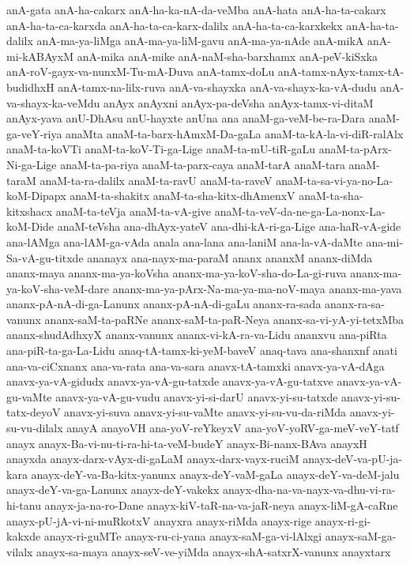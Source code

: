 {anA-gata
anA-ha-cakarx
anA-ha-ka-nA-da-veMba
anA-hata
anA-ha-ta-cakarx
anA-ha-ta-ca-karxda
anA-ha-ta-ca-karx-dalilx
anA-ha-ta-ca-karxkekx
anA-ha-ta-dalilx
anA-ma-ya-liMga
anA-ma-ya-liM-gavu
anA-ma-ya-nAde
anA-mikA
anA-mi-kABAyxM
anA-mika
anA-mike
anA-naM-sha-barxhamx
anA-peV-kiSxka
anA-roV-gayx-va-nunxM-Tu-mA-Duva
anA-tamx-doLu
anA-tamx-nAyx-tamx-tA-budidhxH
anA-tamx-na-lilx-ruva
anA-va-shayxka
anA-va-shayx-ka-vA-dudu
anA-va-shayx-ka-veMdu
anAyx
anAyxni
anAyx-pa-deVsha
anAyx-tamx-vi-ditaM
anAyx-yava
anU-DhAsu
anU-hayxte
anUna
ana
anaM-ga-veM-be-ra-Dara
anaM-ga-veY-riya
anaMta
anaM-ta-barx-hAmxM-Da-gaLa
anaM-ta-kA-la-vi-diR-ralAlx
anaM-ta-koVTi
anaM-ta-koV-Ti-ga-Lige
anaM-ta-mU-tiR-gaLu
anaM-ta-pArx-Ni-ga-Lige
anaM-ta-pa-riya
anaM-ta-parx-caya
anaM-tarA
anaM-tara
anaM-taraM
anaM-ta-ra-dalilx
anaM-ta-ravU
anaM-ta-raveV
anaM-ta-sa-vi-ya-no-La-koM-Dipapx
anaM-ta-shakitx
anaM-ta-sha-kitx-dhAmenxV
anaM-ta-sha-kitxshacx
anaM-ta-teVja
anaM-ta-vA-give
anaM-ta-veV-da-ne-ga-La-nonx-La-koM-Dide
anaM-teVsha
ana-dhAyx-yateV
ana-dhi-kA-ri-ga-Lige
ana-haR-vA-gide
ana-lAMga
ana-lAM-ga-vAda
anala
ana-lana
ana-laniM
ana-la-vA-daMte
ana-mi-Sa-vA-gu-titxde
ananayx
ana-nayx-ma-paraM
ananx
ananxM
ananx-diMda
ananx-maya
ananx-ma-ya-koVsha
ananx-ma-ya-koV-sha-do-La-gi-ruva
ananx-ma-ya-koV-sha-veM-dare
ananx-ma-ya-pArx-Na-ma-ya-ma-noV-maya
ananx-ma-yava
ananx-pA-nA-di-ga-Lanunx
ananx-pA-nA-di-gaLu
ananx-ra-sada
ananx-ra-sa-vanunx
ananx-saM-ta-paRNe
ananx-saM-ta-paR-Neya
ananx-sa-vi-yA-yi-tetxMba
ananx-shudAdhxyX
ananx-vanunx
ananx-vi-kA-ra-va-Lidu
ananxvu
ana-piRta
ana-piR-ta-ga-La-Lidu
anaq-tA-tamx-ki-yeM-baveV
anaq-tava
ana-shanxnf
anati
ana-va-ciCxnanx
ana-va-rata
ana-va-sara
anavx-tA-tamxki
anavx-ya-vA-dAga
anavx-ya-vA-gidudx
anavx-ya-vA-gu-tatxde
anavx-ya-vA-gu-tatxve
anavx-ya-vA-gu-vaMte
anavx-ya-vA-gu-vudu
anavx-yi-si-darU
anavx-yi-su-tatxde
anavx-yi-su-tatx-deyoV
anavx-yi-suva
anavx-yi-su-vaMte
anavx-yi-su-vu-da-riMda
anavx-yi-su-vu-dilalx
anayA
anayoVH
ana-yoV-reYkeyxV
ana-yoV-yoRV-ga-meV-veY-tatf
anayx
anayx-Ba-vi-nu-ti-ra-hi-ta-veM-budeY
anayx-Bi-nanx-BAva
anayxH
anayxda
anayx-darx-vAyx-di-gaLaM
anayx-darx-vayx-ruciM
anayx-deV-va-pU-ja-kara
anayx-deY-va-Ba-kitx-yanunx
anayx-deY-vaM-gaLa
anayx-deY-va-deM-jalu
anayx-deY-va-ga-Lanunx
anayx-deY-vakekx
anayx-dha-na-va-nayx-va-dhu-vi-ra-hi-tanu
anayx-ja-na-ro-Dane
anayx-kiV-taR-na-va-jaR-neya
anayx-liM-gA-caRne
anayx-pU-jA-vi-ni-muRkotxV
anayxra
anayx-riMda
anayx-rige
anayx-ri-gi-kakxde
anayx-ri-guMTe
anayx-ru-ci-yana
anayx-saM-ga-vi-lAlxgi
anayx-saM-ga-vilalx
anayx-sa-maya
anayx-seV-ve-yiMda
anayx-shA-satxrX-vanunx
anayxtarx
}
